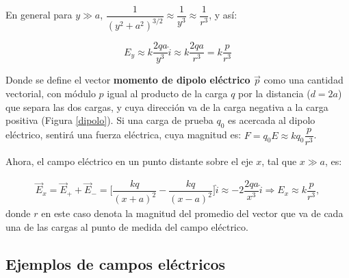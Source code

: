 En general para $y \gg a$, $ \dfrac{1}{(y^2+a^2)^{3/2}} \approx \dfrac{1}{y^3} \approx \dfrac{1}{r^3} $, y así:

\begin{equation}
E _{y}\approx k \dfrac{2qa}{y^3} \hat{i} \approx k \dfrac{2qa}{r^3} = k \dfrac{p}{r^3}
\end{equation}

Donde se define el vector \textbf{momento de dipolo eléctrico $\vec{p}$} como una cantidad vectorial, con módulo $p$ igual al producto de la carga $q$ por la distancia ($d=2a$) que separa las dos cargas, y cuya dirección va de la carga negativa a la carga positiva (Figura \ref{dipolo}). Si una carga de prueba $q_0$ es acercada al dipolo eléctrico, sentirá una fuerza eléctrica, cuya magnitud es: $F=q_0 E \approx k q_0\dfrac{p}{r^3}$.

Ahora, el campo eléctrico en un punto distante sobre el eje $x$, tal que $x \gg a$, es:

\begin{eqnarray}
\vec{E}_x =\vec{E}_{+}+\vec{E}_{-}= \bigg[\dfrac{kq}{(x+a)^2}-\dfrac{kq}{(x-a)^2} \bigg]\hat{i}
\approx -2 \dfrac{2qa}{x^3}\hat{i} \Rightarrow E_x \approx k \dfrac{p}{r^3} ,
\end{eqnarray}
donde $r$ en este caso denota la magnitud del promedio del vector que va de cada una de las cargas al punto de medida del campo eléctrico.

\subsection{Ejemplos de campos eléctricos}

